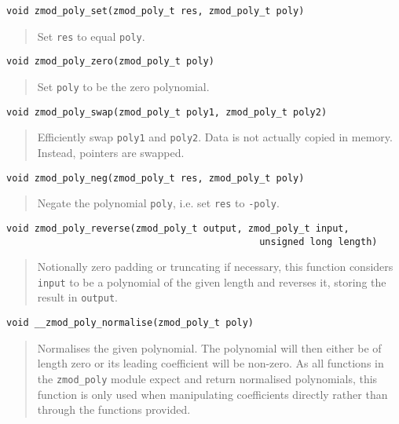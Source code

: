 \documentclass[a4paper,10pt]{article}
\newcommand{\code}{\lstinline}
\begin{document}
\begin{lstlisting}
void zmod_poly_set(zmod_poly_t res, zmod_poly_t poly)
\end{lstlisting}
\begin{quote}
Set \code{res} to equal \code{poly}.
\end{quote}

\begin{lstlisting}
void zmod_poly_zero(zmod_poly_t poly)
\end{lstlisting}
\begin{quote}
Set \code{poly} to be the zero polynomial.
\end{quote}

\begin{lstlisting}
void zmod_poly_swap(zmod_poly_t poly1, zmod_poly_t poly2)
\end{lstlisting}
\begin{quote}
Efficiently swap \code{poly1} and \code{poly2}. Data is not actually copied in memory. Instead, pointers are swapped.
\end{quote}

\begin{lstlisting}
void zmod_poly_neg(zmod_poly_t res, zmod_poly_t poly)
\end{lstlisting}
\begin{quote}
Negate the polynomial \code{poly}, i.e. set \code{res} to \code{-poly}.
\end{quote}

\begin{lstlisting}
void zmod_poly_reverse(zmod_poly_t output, zmod_poly_t input,
                                             unsigned long length)
\end{lstlisting}
\begin{quote}
Notionally zero padding or truncating if necessary, this function considers \code{input} to be a polynomial of the given length and reverses it, storing the result in \code{output}.
\end{quote}

\begin{lstlisting}
void __zmod_poly_normalise(zmod_poly_t poly)
\end{lstlisting}
\begin{quote}
Normalises the given polynomial. The polynomial will then either be of length zero or its leading coefficient will be non-zero. As all functions in the \code{zmod_poly} module expect and return normalised polynomials, this function is only used when manipulating coefficients directly rather than through the functions provided.
\end{quote}
\end{document}
